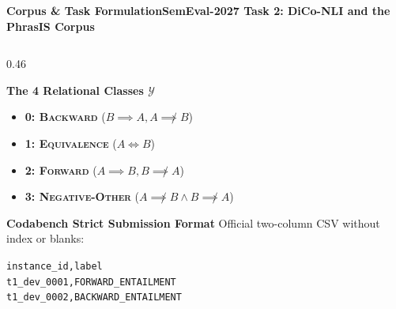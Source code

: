 \documentclass[aspectratio=169,10pt]{beamer}
\begin{document}
\begin{frame}{\textbf{Corpus \& Task Formulation}}{\textbf{SemEval-2027 Task 2: DiCo-NLI and the PhrasIS Corpus}}
\begin{columns}[T]
    \begin{column}{0.46\textwidth}
      \begin{block}{\textbf{The 4 Relational Classes $\mathcal{Y}$}}
        \small
        \begin{itemize}
          \item \textbf{0: \textsc{Backward}} ($B \implies A, A \not\implies B$)
          \item \textbf{1: \textsc{Equivalence}} ($A \iff B$)
          \item \textbf{2: \textsc{Forward}} ($A \implies B, B \not\implies A$)
          \item \textbf{3: \textsc{Negative-Other}} ($A \not\implies B \land B \not\implies A$)
        \end{itemize}
      \end{block}
      \vspace{0.1cm}
      \begin{exampleblock}{\textbf{Codabench Strict Submission Format}}
        \footnotesize
        Official two-column CSV without index or blanks:
        \vspace{0.1cm}
        \begin{center}
          \texttt{instance\_id,label} \\
          \texttt{t1\_dev\_0001,FORWARD\_ENTAILMENT} \\
          \texttt{t1\_dev\_0002,BACKWARD\_ENTAILMENT}
        \end{center}
      \end{exampleblock}
    \end{column}
  \end{columns}
\end{frame}
\end{document}
